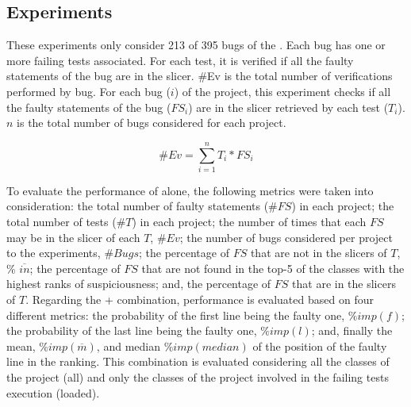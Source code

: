 \documentclass{article}
\begin{document}


\subsection{Experiments}

These experiments only consider 213 of 395 bugs of the \dfj. 
Each bug has one or more failing tests associated. For each test, it is verified if all the faulty statements of the bug are in the slicer. \#Ev is the total number of verifications performed by bug. For each bug ($i$) of the project, this experiment checks if all the faulty statements of the bug ($FS_i$) are in the slicer retrieved by each test ($T_i$). $n$ is the total number of bugs considered for each project.

$$\#Ev = \sum_{i=1}^{n} T_i * FS_i$$

To evaluate the performance of \ds{} alone, the following metrics were taken into consideration: the total number of faulty statements ($\#FS$) in each project; the total number of tests ($\#T$) in each project; the number of times that each $FS$ may be in the slicer of each $T$, $\#Ev$; the number of bugs considered per project to the experiments, $\#Bugs$; the percentage of $FS$ that are not in the slicers of $T$, \% $\overline{in}$; the percentage of $FS$ that are not found in the top-5 of the classes with the highest ranks of suspiciousness; and, the percentage of $FS$ that are in the slicers of $T$. Regarding the \sfl{}+\ds{} combination, performance is evaluated based on four different metrics: the probability of the first line being the faulty one, $\% imp(f)$; the probability of the last line being the faulty one, $\% imp(l)$; and, finally the mean, $\% imp(\overline{m})$, and median $\% imp (median)$ of the position of the faulty line in the ranking. This combination is evaluated considering all the classes of the project (all) and only the classes of the project involved in the failing tests execution (loaded).
\end{document}
